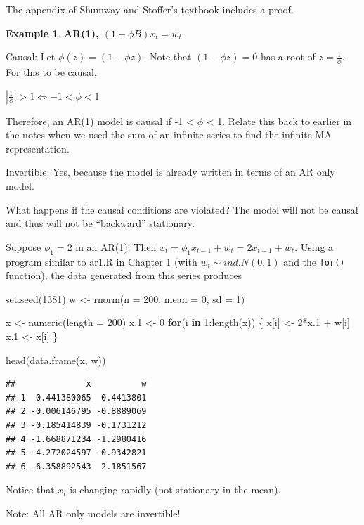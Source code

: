 \documentclass[
]{book}
\newenvironment{Shaded}{\begin{snugshade}}{\end{snugshade}}
\newcommand{\AttributeTok}[1]{\textcolor[rgb]{0.77,0.63,0.00}{#1}}
\newcommand{\ControlFlowTok}[1]{\textcolor[rgb]{0.13,0.29,0.53}{\textbf{#1}}}
\newcommand{\DecValTok}[1]{\textcolor[rgb]{0.00,0.00,0.81}{#1}}
\newcommand{\FloatTok}[1]{\textcolor[rgb]{0.00,0.00,0.81}{#1}}
\newcommand{\FunctionTok}[1]{\textcolor[rgb]{0.00,0.00,0.00}{#1}}
\newcommand{\NormalTok}[1]{#1}
\newcommand{\OtherTok}[1]{\textcolor[rgb]{0.56,0.35,0.01}{#1}}
\newcommand{\SpecialCharTok}[1]{\textcolor[rgb]{0.00,0.00,0.00}{#1}}
\theoremstyle{definition}
\theoremstyle{definition}
\newtheorem{example}{Example}[chapter]
\theoremstyle{definition}
\theoremstyle{definition}
\theoremstyle{remark}
\begin{document}
The appendix of Shumway and Stoffer's textbook includes a proof.

\begin{example}
\textbf{AR(1), \((1-\phi B)x_t=w_t\)}

Causal: Let \(\phi(z) = (1-\phi z)\). Note that \((1-\phi z) = 0\) has a root of \(z = \frac{1}{\phi}\). For this to be causal,

\(|\frac{1}{\phi}|>1 \iff -1 < \phi < 1\)

Therefore, an AR(1) model is causal if -1 \textless{} \(\phi\) \textless{} 1. Relate this back to earlier in the notes when we used the sum of an infinite series to find the infinite MA representation.

Invertible: Yes, because the model is already written in terms of an AR only model.

What happens if the causal conditions are violated? The model will not be causal and thus will not be ``backward'' stationary.

Suppose \(\phi_1 = 2\) in an AR(1). Then \(x_t=\phi_1x_{t-1}+w_t=2x_{t-1}+w_t\). Using a program similar to ar1.R in Chapter 1 (with \(w_t \sim ind. N(0,1)\) and the \texttt{for()} function), the data generated from this series produces

\begin{Shaded}
\begin{Highlighting}[]
\FunctionTok{set.seed}\NormalTok{(}\DecValTok{1381}\NormalTok{)  }
\NormalTok{w }\OtherTok{\textless{}{-}} \FunctionTok{rnorm}\NormalTok{(}\AttributeTok{n =} \DecValTok{200}\NormalTok{, }\AttributeTok{mean =} \DecValTok{0}\NormalTok{, }\AttributeTok{sd =} \DecValTok{1}\NormalTok{)}



\NormalTok{x }\OtherTok{\textless{}{-}} \FunctionTok{numeric}\NormalTok{(}\AttributeTok{length =} \DecValTok{200}\NormalTok{)}
\NormalTok{x}\FloatTok{.1} \OtherTok{\textless{}{-}} \DecValTok{0}
\ControlFlowTok{for}\NormalTok{(i }\ControlFlowTok{in} \DecValTok{1}\SpecialCharTok{:}\FunctionTok{length}\NormalTok{(x)) \{}
\NormalTok{    x[i] }\OtherTok{\textless{}{-}} \DecValTok{2}\SpecialCharTok{*}\NormalTok{x}\FloatTok{.1} \SpecialCharTok{+}\NormalTok{ w[i]}
\NormalTok{    x}\FloatTok{.1} \OtherTok{\textless{}{-}}\NormalTok{ x[i]}
\NormalTok{\}}

\FunctionTok{head}\NormalTok{(}\FunctionTok{data.frame}\NormalTok{(x, w))}
\end{Highlighting}
\end{Shaded}

\begin{verbatim}
##              x          w
## 1  0.441380065  0.4413801
## 2 -0.006146795 -0.8889069
## 3 -0.185414839 -0.1731212
## 4 -1.668871234 -1.2980416
## 5 -4.272024597 -0.9342821
## 6 -6.358892543  2.1851567
\end{verbatim}

Notice that \(x_t\) is changing rapidly (not stationary in the mean).

Note: All AR only models are invertible!
\end{example}
\end{document}
